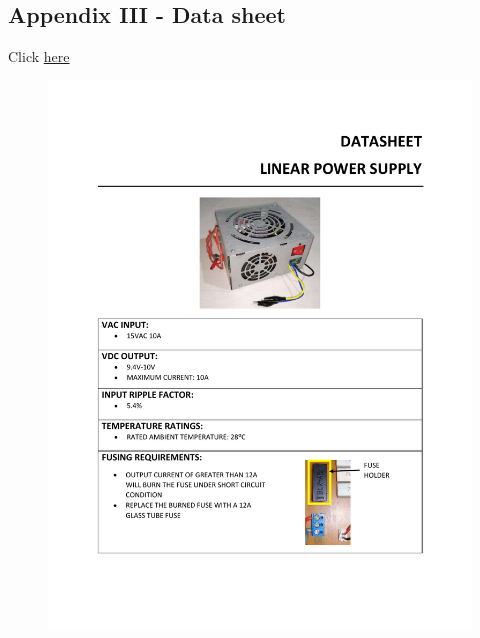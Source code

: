 \documentclass[11pt]{article}
\begin{document}
\subsection{Appendix III - Data sheet}
Click \textcolor{blue}{\hyperlink{page.10}{here}}
\begin{figure}
    \centering
    \includegraphics[width=1\textwidth]{DS1.pdf}
\end{figure}
\end{document}
